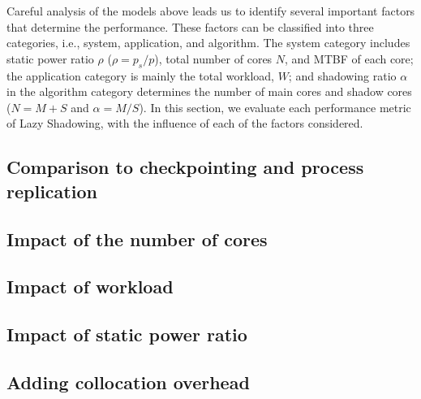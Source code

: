 Careful analysis of the models above leads us to identify several important factors that determine the performance. These factors can be classified into three categories, i.e., system, application, and algorithm. The system category includes static power ratio $\rho$ ($\rho=p_s/p$), total number of cores $N$, and MTBF of each core; the application category is mainly the total workload, $W$; and shadowing ratio $\alpha$ in the algorithm category determines the number of main cores and shadow cores ($N=M+S$ and $\alpha=M/S$). In this section, we evaluate each performance metric of Lazy Shadowing, 
 with the influence of each of the factors considered. %

%

%

%

\subsection{Comparison to checkpointing and process replication}
\label{eval_comparison}


\subsection{Impact of the number of cores}
\label{eval_core}


\subsection{Impact of workload}
\label{eval_workload}


\subsection{Impact of static power ratio}
\label{eval_static_power}


\subsection{Adding collocation overhead}
\label{eval_collocation}

